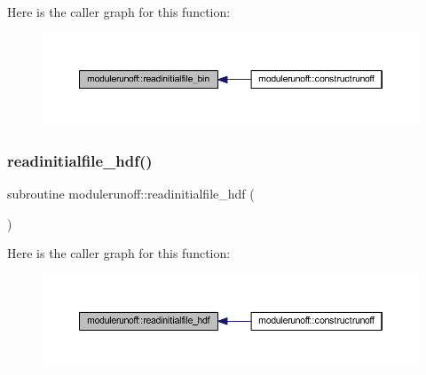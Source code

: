 Here is the caller graph for this function\+:\nopagebreak
\begin{figure}[H]
\begin{center}
\leavevmode
\includegraphics[width=350pt]{namespacemodulerunoff_abc7533c7bdb5fde4b69ad3d1db1b0b1a_icgraph}
\end{center}
\end{figure}
\mbox{\label{namespacemodulerunoff_a0076542117101ad74013563790aca394}} 
\subsubsection{\texorpdfstring{readinitialfile\+\_\+hdf()}{readinitialfile\_hdf()}}
{\footnotesize\ttfamily subroutine modulerunoff\+::readinitialfile\+\_\+hdf (\begin{DoxyParamCaption}{ }\end{DoxyParamCaption})\hspace{0.3cm}{\ttfamily [private]}}

Here is the caller graph for this function\+:\nopagebreak
\begin{figure}[H]
\begin{center}
\leavevmode
\includegraphics[width=350pt]{namespacemodulerunoff_a0076542117101ad74013563790aca394_icgraph}
\end{center}
\end{figure}
\mbox{\label{namespacemodulerunoff_a16bc6313240379de466a61574c8dbc1d}} 
